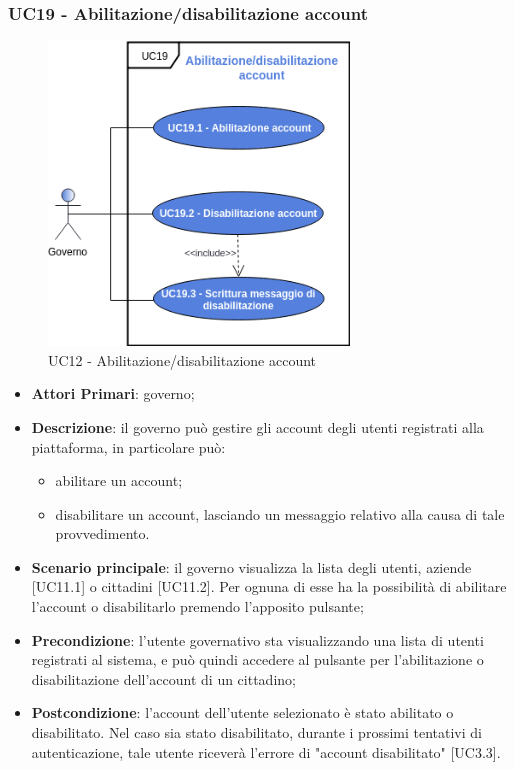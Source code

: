 \subsubsection{UC19 - Abilitazione/disabilitazione account}
\begin{figure}[h]
	\includegraphics[width=8cm]{res/images/UC19.png}
	\centering
	\caption{UC12 - Abilitazione/disabilitazione account}
\end{figure}
\begin{itemize}
	\item \textbf{Attori Primari}:
	governo;
	\item \textbf{Descrizione}: il governo può gestire gli account degli utenti registrati alla piattaforma, in particolare può:
	\begin{itemize}
		\item abilitare un account;
		\item disabilitare un account, lasciando un messaggio relativo alla causa di tale provvedimento.
	\end{itemize}
	\item \textbf{Scenario principale}: il governo visualizza la lista degli utenti, aziende [UC11.1] o cittadini [UC11.2]. Per ognuna di esse ha la possibilità di abilitare l'account o disabilitarlo premendo l'apposito pulsante;
	\item \textbf{Precondizione}: l'utente governativo sta visualizzando una lista di utenti registrati al sistema, e può quindi accedere al pulsante per l'abilitazione o disabilitazione dell'account di un cittadino;
	\item \textbf{Postcondizione}: l'account dell'utente selezionato è stato abilitato o disabilitato. Nel caso sia stato disabilitato, durante i prossimi tentativi di autenticazione, tale utente riceverà l'errore di "account disabilitato" [UC3.3].
\end{itemize} 

